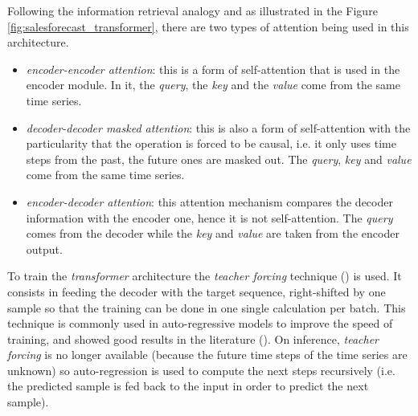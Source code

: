 Following the information retrieval analogy and as illustrated in the Figure \ref{fig:salesforecast_transformer}, there are two types of attention being used in this architecture.
\begin{itemize}
	\item \textit{encoder-encoder attention}: this is a form of self-attention that is used in the encoder module. In it, the \textit{query}, the \textit{key} and the \textit{value} come from the same time series.
	\item \textit{decoder-decoder masked attention}: this is also a form of self-attention with the particularity that the operation is forced to be causal, i.e. it only uses time steps from the past, the future ones are masked out. The \textit{query}, \textit{key} and \textit{value} come from the same time series.
	\item \textit{encoder-decoder attention}: this attention mechanism compares the decoder information with the encoder one, hence it is not self-attention. The \textit{query} comes from the decoder while the \textit{key} and \textit{value} are taken from the encoder output.
\end{itemize}

To train the \textit{transformer} architecture the \textit{teacher forcing} technique (\cite{williams1989, goyal2016}) is used. It consists in feeding the decoder with the target sequence, right-shifted by one sample so that the training can be done in one single calculation per batch. This technique is commonly used in auto-regressive models to improve the speed of training, and showed good results in the literature (\cite{vaswani2017}). On inference, \textit{teacher forcing} is no longer available (because the future time steps of the time series are unknown) so auto-regression is used to compute the next steps recursively (i.e. the predicted sample is fed back to the input in order to predict the next sample).


